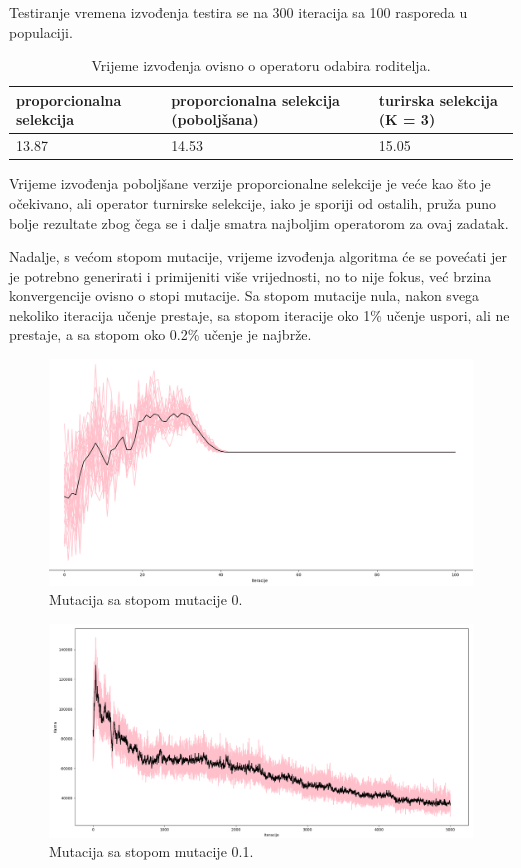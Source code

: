 \documentclass[times, utf8, zavrsni]{fer}
\begin{document}
Testiranje vremena izvođenja  testira se na 300 iteracija sa 100 rasporeda u populaciji.

\begin{table}[htb]
\caption{Vrijeme izvođenja ovisno o operatoru odabira roditelja.}
\label{tbl:iter-roditelj}
\centering
\begin{tabular}{lll} \hline
proporcionalna selekcija & proporcionalna selekcija (poboljšana) &  turirska selekcija (K = 3)\\ \hline
13.87 & 14.53 & 15.05\\ \hline
\end{tabular}
\end{table}

Vrijeme izvođenja poboljšane verzije proporcionalne selekcije je veće kao što je očekivano, ali operator turnirske selekcije, iako je sporiji od ostalih, pruža puno bolje rezultate zbog čega se i dalje smatra najboljim operatorom za ovaj zadatak.

Nadalje, s većom stopom mutacije, vrijeme izvođenja algoritma će se povećati jer je potrebno generirati i primijeniti više vrijednosti, no to nije fokus, već brzina konvergencije ovisno o stopi mutacije. Sa stopom mutacije nula, nakon svega nekoliko iteracija učenje prestaje, sa stopom iteracije oko 1\% učenje uspori, ali ne prestaje, a sa stopom oko 0.2\% učenje je najbrže.

\newpage

\begin{figure}[htb]
\centering
\includegraphics[width=14cm]{images/mutacija_nula.png}
\caption{Mutacija sa stopom mutacije 0.}
\label{fig:mutacija_nula}
\end{figure}

\begin{figure}[htb]
\centering
\includegraphics[width=14cm]{images/mutacija_velika.png}
\caption{Mutacija sa stopom mutacije 0.1.}
\label{fig:mutacija_velika}
\end{figure}
\end{document}
